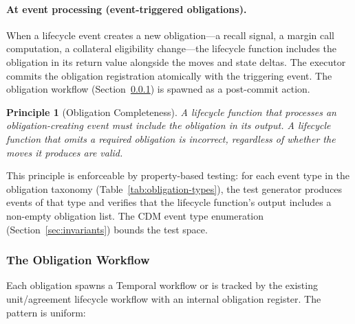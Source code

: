 \documentclass[11pt,a4paper]{article}
\newtheorem{principle}[definition]{Principle}
\begin{document}
\paragraph{At event processing (event-triggered obligations).}
When a lifecycle event creates a new obligation---a recall signal, a margin call computation, a collateral eligibility change---the lifecycle function includes the obligation in its return value alongside the moves and state deltas. The executor commits the obligation registration atomically with the triggering event. The obligation workflow (Section~\ref{sec:obligation-workflow}) is spawned as a post-commit action.

\begin{principle}[Obligation Completeness]
\label{princ:obligation-completeness}
A lifecycle function that processes an obligation-creating event must include the obligation in its output. A lifecycle function that omits a required obligation is incorrect, regardless of whether the moves it produces are valid.
\end{principle}

\noindent This principle is enforceable by property-based testing: for each event type in the obligation taxonomy (Table~\ref{tab:obligation-types}), the test generator produces events of that type and verifies that the lifecycle function's output includes a non-empty obligation list. The CDM event type enumeration (Section~\ref{sec:invariants}) bounds the test space.

\subsubsection{The Obligation Workflow}
\label{sec:obligation-workflow}

Each obligation spawns a Temporal workflow or is tracked by the existing unit/agreement lifecycle workflow with an internal obligation register. The pattern is uniform:
\end{document}
